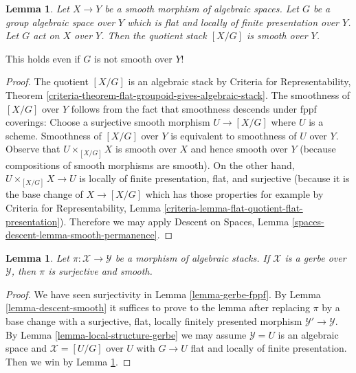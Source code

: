 \documentclass{stacks-project}
\theoremstyle{plain}
\newtheorem{lemma}[subsection]{Lemma}
\theoremstyle{definition}
\theoremstyle{remark}
\numberwithin{equation}{subsection}
\begin{document}
\begin{lemma}
\label{lemma-smooth-quotient-stack}
Let $X \to Y$ be a smooth morphism of algebraic spaces.
Let $G$ be a group algebraic space over $Y$ which is flat
and locally of finite presentation over $Y$. Let $G$ act on $X$ over $Y$.
Then the quotient stack $[X/G]$ is smooth over $Y$.
\end{lemma}

\noindent
This holds even if $G$ is not smooth over $Y$!

\begin{proof}
The quotient $[X/G]$ is an algebraic stack by
Criteria for Representability, Theorem
\ref{criteria-theorem-flat-groupoid-gives-algebraic-stack}.
The smoothness of $[X/G]$ over $Y$ follows from the fact that smoothness
descends under fppf coverings:
Choose a surjective smooth morphism $U \to [X/G]$ where $U$ is a scheme.
Smoothness of $[X/G]$ over $Y$ is equivalent to smoothness of $U$ over $Y$.
Observe that $U \times_{[X/G]} X$ is smooth over $X$ and hence smooth
over $Y$ (because compositions of smooth morphisms are smooth).
On the other hand, $U \times_{[X/G]} X \to U$ is locally of
finite presentation, flat, and surjective (because it is
the base change of $X \to [X/G]$ which has those properties
for example by Criteria for Representability, Lemma
\ref{criteria-lemma-flat-quotient-flat-presentation}).
Therefore we may apply Descent on Spaces,
Lemma \ref{spaces-descent-lemma-smooth-permanence}.
\end{proof}

\begin{lemma}
\label{lemma-gerbe-smooth}
Let $\pi : \mathcal{X} \to \mathcal{Y}$ be a morphism of algebraic stacks.
If $\mathcal{X}$ is a gerbe over $\mathcal{Y}$, then $\pi$ is surjective
and smooth.
\end{lemma}

\begin{proof}
We have seen surjectivity in Lemma \ref{lemma-gerbe-fppf}.
By Lemma \ref{lemma-descent-smooth}
it suffices to prove to the lemma after replacing $\pi$ by a base change
with a surjective, flat, locally finitely presented morphism
$\mathcal{Y}' \to \mathcal{Y}$. By
Lemma \ref{lemma-local-structure-gerbe}
we may assume $\mathcal{Y} = U$ is an algebraic space and
$\mathcal{X} = [U/G]$ over $U$ with $G \to U$ flat and
locally of finite presentation.
Then we win by Lemma \ref{lemma-smooth-quotient-stack}.
\end{proof}
\end{document}

